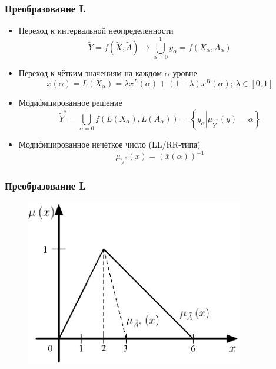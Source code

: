 \documentclass[12pt]{beamer}
\begin{document}
\begin{frame}
  \frametitle{Преобразование L}
  \begin{itemize}
    \item Переход к интервальной неопределенности
      \begin{equation}
        \label{eq:task-transform}
      	\tilde{Y} = f\left( \tilde X, \tilde A \right)\to \bigcup\limits_{\alpha =0}^{1}{y_\alpha}=f\left( X_\alpha, A_\alpha \right)
      \end{equation}
    \item Переход к чётким значениям на каждом $\alpha$-уровне 
      \begin{equation}
        \label{eq:L-transform-base}
        \bar{x}\left( \alpha  \right)=L\left( X_\alpha \right)=\lambda x^L \left( \alpha  \right)+\left( 1-\lambda  \right) x^R \left( \alpha  \right);\, \lambda \in \left[0; 1 \right]
      \end{equation}
    \item Модифицированное решение
      \begin{equation}
        \tilde Y^{*}= \bigcup\limits_{\alpha =0}^{1} f\left(L\left( X_\alpha \right), L\left( A_\alpha \right) \right)=\left\{ y_\alpha \left| \mu_{\tilde Y^*}(y)=\alpha \right. \right\}
      \end{equation}
    \item Модифицированное нечёткое число (LL/RR-типа)
      \begin{equation}
        \label{eq:modified-number}
        \mu_{\tilde A^{*}}\left( x \right)={\left( \bar{x}\left( \alpha  \right) \right)}^{-1}
      \end{equation}
  \end{itemize}
\end{frame}


\begin{frame}
  \frametitle{Преобразование L}
  \begin{figure}
    \center
    \includegraphics[width=0.85\textwidth]{sample-224}
  \end{figure}
\end{frame}
\end{document}
